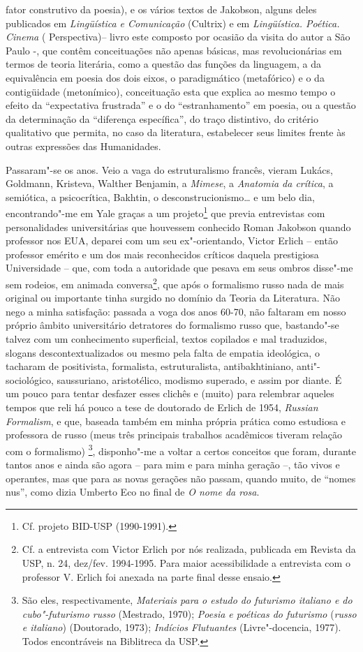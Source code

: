 fator construtivo da poesia), e os vários textos de Jakobson, alguns
deles publicados em \emph{Lingüística e Comunicação} (Cultrix) e em
\emph{Lingüística. Poética. Cinema} ( Perspectiva)-- livro este composto
por ocasião da visita do autor a São Paulo -, que contêm conceituações
não apenas básicas, mas revolucionárias em termos de teoria literária,
como a questão das funções da linguagem, a da equivalência em poesia dos
dois eixos, o paradigmático (metafórico) e o da contigüidade
(metonímico), conceituação esta que explica ao mesmo tempo o efeito da
``expectativa frustrada'' e o do ``estranhamento'' em poesia, ou a
questão da determinação da ``diferença específica'', do traço
distintivo, do critério qualitativo que permita, no caso da literatura,
estabelecer seus limites frente às outras expressões das Humanidades.

Passaram"-se os anos. Veio a vaga do estruturalismo francês, vieram
Lukács, Goldmann, Kristeva, Walther Benjamin, a \emph{Mimese}, a
\emph{Anatomia da crítica}, a semiótica, a psicocrítica, Bakhtin, o
desconstrucionismo\ldots{} e um belo dia, encontrando"-me em Yale graças a um
projeto\footnote{Cf. projeto BID-USP (1990-1991).} que previa
entrevistas com personalidades universitárias que houvessem conhecido
Roman Jakobson quando professor nos EUA, deparei com um seu
ex"-orientando, Victor Erlich -- então professor emérito e um dos mais
reconhecidos críticos daquela prestigiosa Universidade -- que, com toda
a autoridade que pesava em seus ombros disse"-me sem rodeios, em animada
conversa\footnote{Cf. a entrevista com Victor Erlich por nós realizada,
  publicada em Revista da USP, n. 24, dez/fev. 1994-1995. Para maior
  acessibilidade a entrevista com o professor V. Erlich foi anexada na
  parte final desse ensaio.}, que após o formalismo russo nada de mais
original ou importante tinha surgido no domínio da Teoria da Literatura.
Não nego a minha satisfação: passada a voga dos anos 60-70, não faltaram
em nosso próprio âmbito universitário detratores do formalismo russo
que, bastando"-se talvez com um conhecimento superficial, textos
copilados e mal traduzidos, slogans descontextualizados ou mesmo pela
falta de empatia ideológica, o tacharam de positivista, formalista,
estruturalista, antibakhtiniano, anti"-sociológico, saussuriano,
aristotélico, modismo superado, e assim por diante. É um pouco para
tentar desfazer esses clichês e (muito) para relembrar aqueles tempos
que reli há pouco a tese de doutorado de Erlich de 1954, \emph{Russian
Formalism}, e que, baseada também em minha própria prática como
estudiosa e professora de russo (meus três principais trabalhos
acadêmicos tiveram relação com o formalismo) \footnote{São eles,
  respectivamente, \emph{Materiais para o estudo do futurismo italiano e
  do cubo"-futurismo russo} (Mestrado, 1970); \emph{Poesia e poéticas do
  futurismo} (\emph{russo e italiano}) (Doutorado, 1973); \emph{Indícios
  Flutuantes} (Livre"-docencia, 1977). Todos encontráveis na Biblitreca
  da USP.}, disponho"-me a voltar a certos conceitos que foram, durante
tantos anos e ainda são agora -- para mim e para minha geração --, tão
vivos e operantes, mas que para as novas gerações não passam, quando
muito, de ``nomes nus'', como dizia Umberto Eco no final de \emph{O nome
da rosa}.

